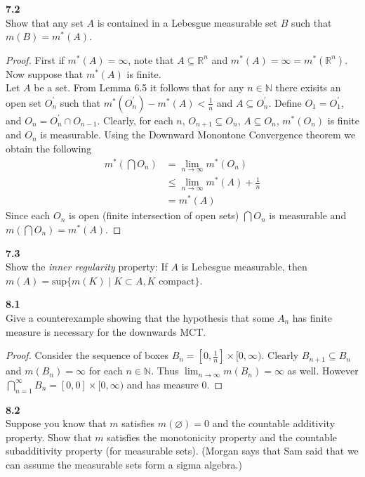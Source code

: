 \documentclass[12pt]{article}
\newcommand{\problem}[1]{\hspace{-4 ex} \large \textbf{#1}\\}
\let\emptyset\varnothing
\begin{document}
\problem{7.2} Show that any set $A$ is contained in a Lebesgue measurable set $B$ such that $m(B)=m^*(A)$.

	\begin{proof}
		First if $m^*(A) = \infty$, note that $A \subseteq \mathbb{R}^n$ and $m^*(A) = \infty = m^*(\mathbb{R}^n)$. Now suppose that $m^*(A)$ is finite. \\
		Let $A$ be a set. From Lemma 6.5 it follows that for any $n \in \mathbb{N}$ there exisits an open set $O_n^\prime$ such that $m^*(O_n^\prime) - m^*(A) < \tfrac{1}{n}$ and $A \subseteq O_n^\prime$. Define $O_1 = O_1^\prime$, and $O_n = O_{n}^\prime \cap O_{n-1}$. Clearly, for each $n$, $O_{n+1} \subseteq O_n$, $A \subseteq O_n$, $m^*(O_n)$ is finite and $O_n$ is measurable. Using the Downward Monontone Convergence theorem we obtain the following
		\begin{align*}
			m^*(\bigcap O_n) & = \lim_{n \to \infty} m^*(O_n) \\
			& \leq \lim_{n \to \infty} m^*(A) + \tfrac{1}{n} \\
			& = m^*(A)
		\end{align*}
		Since each $O_n$ is open (finite intersection of open sets) $\bigcap O_n$ is measurable and $m(\bigcap O_n) = m^*(A)$.
	\end{proof}

\problem{7.3} Show the \emph{inner regularity} property: If $A$ is Lebesgue measurable, then $m(A)=\text{sup}\{m(K)\mid K\subset A, K\text{ compact}\}$.

\problem{8.1} Give a counterexample showing that the hypothesis that some $A_n$ has finite measure is necessary for the downwards MCT.

	\begin{proof}
		Consider the sequence of boxes $B_n = [0,\tfrac{1}{n}] \times [0, \infty)$. Clearly $B_{n+1} \subseteq B_n$ and $m(B_n)=\infty$ for each $n \in \mathbb{N}$. Thus $\lim_{n \to \infty}m(B_n) = \infty$ as well. However $\bigcap_{n=1}^{\infty}B_n = [0,0] \times [0,\infty)$ and has measure $0$.
	\end{proof}

\problem{8.2} Suppose you know that $m$ satisfies $m(\emptyset)=0$ and the countable additivity property. Show that $m$ satisfies the monotonicity property and the countable subadditivity property (for measurable sets). (Morgan says that Sam said that we can assume the measurable sets form a sigma algebra.)
\end{document}
